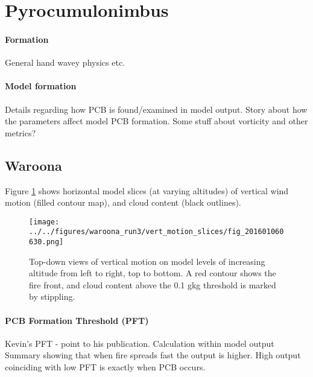 \section{Pyrocumulonimbus}
  \label{pcb}
  
  \paragraph{Formation}
    General hand wavey physics etc.
     
  \paragraph{Model formation}
    Details regarding how PCB is found/examined in model output.
    Story about how the parameters affect model PCB formation.
    Some stuff about vorticity and other metrics?
    
  \subsection{Waroona}
    \label{pcb:waroona}
    
    Figure \ref{fig:pcb:waroona:vert_motion_slices} shows horizontal model slices (at varying altitudes) of vertical wind motion (filled contour map), and cloud content (black outlines). 
    
    \begin{figure}
      \texttt{[image: ../../figures/waroona\_run3/vert\_motion\_slices/fig\_201601060630.png]}
      \caption{%
        Top-down views of vertical motion on model levels of increasing altitude from left to right, top to bottom. 
        A red contour shows the fire front, and cloud content above the 0.1 g\/kg threshold is marked by stippling.
        }
      \label{fig:pcb:waroona:vert_motion_slices}
    \end{figure}
    
    
  \paragraph{PCB Formation Threshold (PFT)}
    Kevin's PFT - point to his publication.
    Calculation within model output
    Summary showing that when fire spreads fast the output is higher.
    High output coinciding with low PFT is exactly when PCB occurs.
  